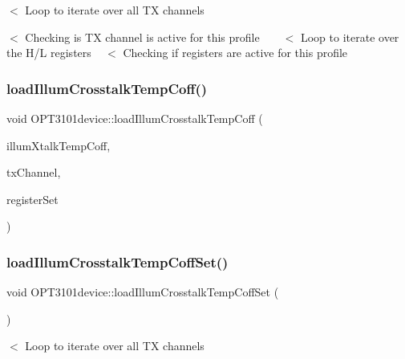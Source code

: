 $<$ Loop to iterate over all TX channels

$<$ Checking is TX channel is active for this profile ~\newline
~\newline
 $<$ Loop to iterate over the H/L registers ~\newline
 $<$ Checking if registers are active for this profile \mbox{\label{class_o_p_t3101device_ad5782b69e7af9d5cf4db1bd2ba9caf67}} 
\subsubsection{\texorpdfstring{load\+Illum\+Crosstalk\+Temp\+Coff()}{loadIllumCrosstalkTempCoff()}}
{\footnotesize\ttfamily void O\+P\+T3101device\+::load\+Illum\+Crosstalk\+Temp\+Coff (\begin{DoxyParamCaption}\item[{\mbox{\hyperlink{class_o_p_t3101_1_1crosstalk_temp_coff_c}{O\+P\+T3101\+::crosstalk\+Temp\+CoffC}} $\ast$}]{illum\+Xtalk\+Temp\+Coff,  }\item[{uint8\+\_\+t}]{tx\+Channel,  }\item[{char}]{register\+Set }\end{DoxyParamCaption})}

\mbox{\label{class_o_p_t3101device_a00d7d06d232d29570cbc6f751b991419}} 
\subsubsection{\texorpdfstring{load\+Illum\+Crosstalk\+Temp\+Coff\+Set()}{loadIllumCrosstalkTempCoffSet()}}
{\footnotesize\ttfamily void O\+P\+T3101device\+::load\+Illum\+Crosstalk\+Temp\+Coff\+Set (\begin{DoxyParamCaption}\item[{void}]{ }\end{DoxyParamCaption})}

$<$ Loop to iterate over all TX channels

